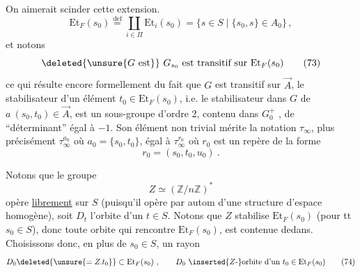 On aimerait scinder cette extension. 
\[
\mathrm{Et}_F(s_0)\overset{\mathrm{def}}{=}\coprod_{i\in\Pi}\mathrm{Et}_i(s_0)
=\{s\in S\mid\{s_0,s\}\in A_0\}\,,
\tag*{(72)}
\]
et notons
\[
\deleted{\unsure{G\ \text{est}}}\ G_{s_0}\text{ est transitif sur }\mathrm{Et}_F(s_0)
\tag*{(73)}
\]
ce qui résulte encore formellement du fait que $G$ est transitif sur $\vec A$,  le stabilisateur  d'un élément $t_0\in\mathrm{Et}_F(s_0)$, i.e. le stabilisateur dans $G$ de $a\ (s_0,t_0)\in\vec A$, est un sous-groupe d'ordre 2, contenu dans $G_0^+$ , de ``déterminant'' égal à $-1$. Son élément non trivial mérite la notation $\tau_\infty$, plus précisément $\tau_\infty^{a_0}$ où $a_0=\{s_0,t_0\}$, égal à $\tau_\infty^{r_0}$ où $r_0$ est un repère de la forme
\[
r_0=(s_0,t_0,u_0)\ .
\]

Notons que le groupe
\[
Z\simeq(\mathbb Z/n\mathbb Z)^*
\]
opère \uline{librement} sur $S$ (puisqu'il opère par autom d'une structure d'espace homogène), soit $D_t$  l'orbite  d'un $t\in S$. Notons que $Z$ stabilise $\mathrm{Et}_F(s_0)$ (pour tt $s_0\in S$), donc toute orbite  qui rencontre $\mathrm{Et}_F(s_0)$, est contenue dedans. Choisissons donc, en plus de $s_0\in S$, un rayon 
\[
D_0\deleted{\unsure{=Z.t_0}}\subset\mathrm{Et}_F(s_0)\ ,\qquad D_0\ \inserted{Z\text{-}}\text{orbite d'un }
t_0\in\mathrm{Et}_F(s_0)
\tag*{(74)}
\]
